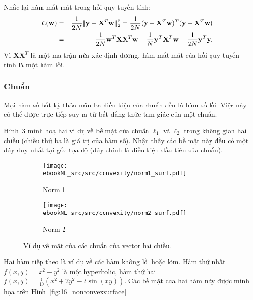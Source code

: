 Nhắc lại hàm mất mát trong hồi quy tuyến tính:
\begin{eqnarray*}
\mathcal{L}(\mathbf{w}) &=& \frac{1}{2N} \|\mathbf{y} -
\mathbf{X}^T\mathbf{w}\|_2^2 = \frac{1}{2N} (\mathbf{y} -
\mathbf{X}^T\mathbf{w})^T(\mathbf{y} - \mathbf{X}^T\mathbf{w})  \\\
&=& \frac{1}{2N} \mathbf{w}^T\mathbf{X}\mathbf{X}^T\mathbf{w} -
\frac{1}{N}\mathbf{y}^T\mathbf{X}^T\mathbf{w} + \frac{1}{2N}\mathbf{y}^T\mathbf{y}.
\end{eqnarray*}
Vì $\mathbf{X}\mathbf{X}^T$ là một ma trận nửa xác định dương, hàm mất mát của
hồi quy tuyến tính là một hàm lồi.


\subsubsection{Chuẩn}
Mọi hàm số bất kỳ thỏa mãn ba điều kiện của chuẩn đều là hàm số lồi. Việc này có thể
được trực tiếp suy ra từ bất đẳng thức tam giác của một chuẩn.


Hình~\ref{fig:16_norm_surf} minh hoạ hai ví dụ về bề mặt của chuẩn $\ell_1$ và
$\ell_2$
trong không gian hai chiều (chiều thứ ba là giá trị của hàm
số). Nhận thấy các bề mặt này đều có {một đáy duy nhất} tại gốc tọa độ (đây chính là điều kiện đầu tiên của chuẩn).


\begin{figure}[t]
\begin{subfigure}{0.48\textwidth}
\texttt{[image: ebookML\_src/src/convexity/norm1\_surf.pdf]}
\caption{Norm 1}
\label{fig:subim1}
\end{subfigure}
\begin{subfigure}{0.48\textwidth}
\texttt{[image: ebookML\_src/src/convexity/norm2\_surf.pdf]}
\caption{Norm 2}
\label{fig:subim2}
\end{subfigure}
\caption{Ví dụ về mặt của các chuẩn của vector hai chiều.}
\label{fig:16_norm_surf}
\end{figure}
Hai hàm tiếp theo là ví dụ về các hàm không lồi hoặc lõm. Hàm
thứ nhất $f(x, y) = x^2 - y^2$ là một hyperbolic, hàm thứ hai $f(x,y) =
\frac{1}{10}(x^2 + 2y^2 - 2\sin(xy)) $. Các bề mặt của hai hàm này được minh
họa trên Hình~\ref{fig:16_nonconvexsurface}



